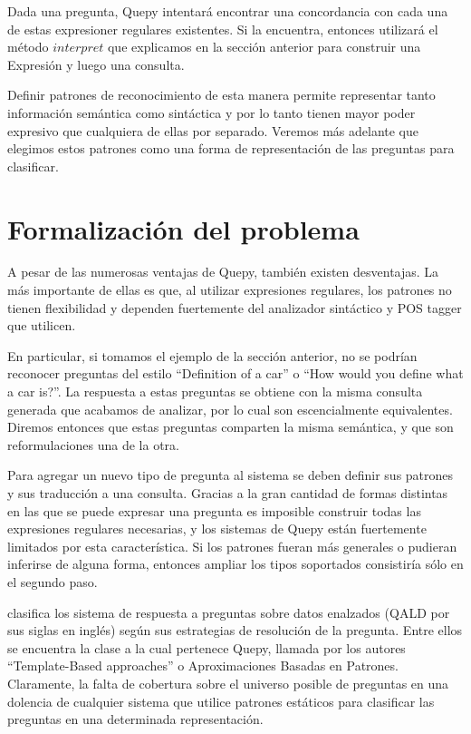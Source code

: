 Dada una pregunta, Quepy intentará encontrar una concordancia con cada una de estas expresioner regulares existentes. Si la encuentra, entonces utilizará el método $interpret$ que explicamos en la sección anterior para construir una Expresión y luego una consulta.

Definir patrones de reconocimiento de esta manera permite representar tanto información semántica como sintáctica y por lo tanto tienen mayor poder expresivo que cualquiera de ellas por separado. Veremos más adelante que elegimos estos patrones como una forma de representación de las preguntas para clasificar.

\section{Formalización del problema}

A pesar de las numerosas ventajas de Quepy, también existen desventajas. La más importante de ellas es que, al utilizar expresiones regulares, los patrones no tienen flexibilidad y dependen fuertemente del analizador sintáctico y POS tagger que utilicen.

En particular, si tomamos el ejemplo de la sección anterior, no se podrían reconocer preguntas del estilo ``Definition of a car'' o ``How would you define what a car is?''. La respuesta a estas preguntas se obtiene con la misma consulta generada que acabamos de analizar, por lo cual son escencialmente equivalentes. Diremos entonces que estas preguntas comparten la misma semántica, y que son reformulaciones una de la otra.

Para agregar un nuevo tipo de pregunta al sistema se deben definir sus patrones y sus traducción a una consulta. Gracias a la gran cantidad de formas distintas en las que se puede expresar una pregunta es imposible construir todas las expresiones regulares necesarias, y los sistemas de Quepy están fuertemente limitados por esta característica. Si los patrones fueran más generales o pudieran inferirse de alguna forma, entonces ampliar los tipos soportados consistiría sólo en el segundo paso.

\citet{ungerQALD} clasifica los sistema de respuesta a preguntas sobre datos enalzados (QALD por sus siglas en inglés) según sus estrategias de resolución de la pregunta. Entre ellos se encuentra la clase a la cual pertenece Quepy, llamada por los autores ``Template-Based approaches'' o Aproximaciones Basadas en Patrones. Claramente, la falta de cobertura sobre el universo posible de preguntas en una dolencia de cualquier sistema que utilice patrones estáticos para clasificar las preguntas en una determinada representación.


